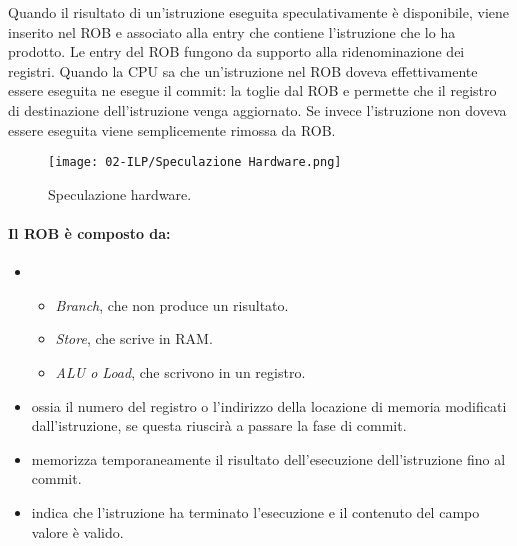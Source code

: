 



Quando il risultato di un'istruzione eseguita speculativamente è disponibile, viene inserito nel ROB e associato alla entry che contiene l'istruzione che lo ha prodotto. Le entry del ROB fungono da supporto alla ridenominazione dei registri. 
Quando la CPU sa che un'istruzione nel ROB doveva effettivamente essere eseguita ne esegue il commit: la toglie dal ROB e permette che il registro di destinazione dell'istruzione venga aggiornato. Se invece l'istruzione non doveva essere eseguita viene semplicemente rimossa da ROB.


\begin{figure}[!h]
    \centering
    \texttt{[image: 02-ILP/Speculazione Hardware.png]}
    \caption{Speculazione hardware.}
\end{figure}

\paragraph{Il ROB è composto da:} 

\begin{itemize}
  \item {} 
    \begin{itemize}
      \item \textit{Branch}, che non produce un risultato. 
      \item \textit{Store}, che scrive in RAM. 
      \item \textit{ALU o Load}, che scrivono in un registro.
    \end{itemize}
  \item {} ossia il numero del registro o l'indirizzo della locazione di memoria modificati dall'istruzione, se questa riuscirà a passare la fase di commit. 
  \item {} memorizza temporaneamente il risultato dell'esecuzione dell'istruzione fino al commit. 
  \item {} indica che l'istruzione ha terminato l'esecuzione e il contenuto del campo valore è valido.
\end{itemize}

